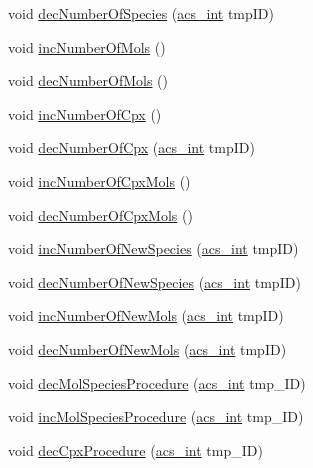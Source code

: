 \begin{DoxyCompactItemize}
\item 
void \hyperlink{a00011_a69a926e0b9bb4f4b29876d0e45b54d84}{dec\-Number\-Of\-Species} (\hyperlink{a00024_a8d277355641a098190360234e2ebde35}{acs\-\_\-int} tmp\-I\-D)
\item 
void \hyperlink{a00011_ae356db3b6ee374b998e9f041216b4b75}{inc\-Number\-Of\-Mols} ()
\item 
void \hyperlink{a00011_af042f7904c92fdd239995bebbab2cf60}{dec\-Number\-Of\-Mols} ()
\item 
void \hyperlink{a00011_a69ae530ef6f9298e3ab8304157709404}{inc\-Number\-Of\-Cpx} ()
\item 
void \hyperlink{a00011_aadd057e7038269e6fac314a12a3bf334}{dec\-Number\-Of\-Cpx} (\hyperlink{a00024_a8d277355641a098190360234e2ebde35}{acs\-\_\-int} tmp\-I\-D)
\item 
void \hyperlink{a00011_ab101d2158575829ddfe846087040f2fa}{inc\-Number\-Of\-Cpx\-Mols} ()
\item 
void \hyperlink{a00011_a756dc43b6b47498ba457613749324b15}{dec\-Number\-Of\-Cpx\-Mols} ()
\item 
void \hyperlink{a00011_a1055886a34a9a01ec37db31c69e460e0}{inc\-Number\-Of\-New\-Species} (\hyperlink{a00024_a8d277355641a098190360234e2ebde35}{acs\-\_\-int} tmp\-I\-D)
\item 
void \hyperlink{a00011_a5fa52a4f8e73a71fa41d3a1641e50535}{dec\-Number\-Of\-New\-Species} (\hyperlink{a00024_a8d277355641a098190360234e2ebde35}{acs\-\_\-int} tmp\-I\-D)
\item 
void \hyperlink{a00011_a1addb84f0c8d391f97ad2347a64208bb}{inc\-Number\-Of\-New\-Mols} (\hyperlink{a00024_a8d277355641a098190360234e2ebde35}{acs\-\_\-int} tmp\-I\-D)
\item 
void \hyperlink{a00011_ae9bbd78076706050ced4dd7fb99036f1}{dec\-Number\-Of\-New\-Mols} (\hyperlink{a00024_a8d277355641a098190360234e2ebde35}{acs\-\_\-int} tmp\-I\-D)
\item 
void \hyperlink{a00011_a10fad450cf5ef3a1c7cf75d616105069}{dec\-Mol\-Species\-Procedure} (\hyperlink{a00024_a8d277355641a098190360234e2ebde35}{acs\-\_\-int} tmp\-\_\-\-I\-D)
\item 
void \hyperlink{a00011_a7e0e11e36d7bcd6ef438c426aa8754a0}{inc\-Mol\-Species\-Procedure} (\hyperlink{a00024_a8d277355641a098190360234e2ebde35}{acs\-\_\-int} tmp\-\_\-\-I\-D)
\item 
void \hyperlink{a00011_a16d09f818d3012f88e8e4c9a7759b6bd}{dec\-Cpx\-Procedure} (\hyperlink{a00024_a8d277355641a098190360234e2ebde35}{acs\-\_\-int} tmp\-\_\-\-I\-D)
\item 

\end{DoxyCompactItemize}
